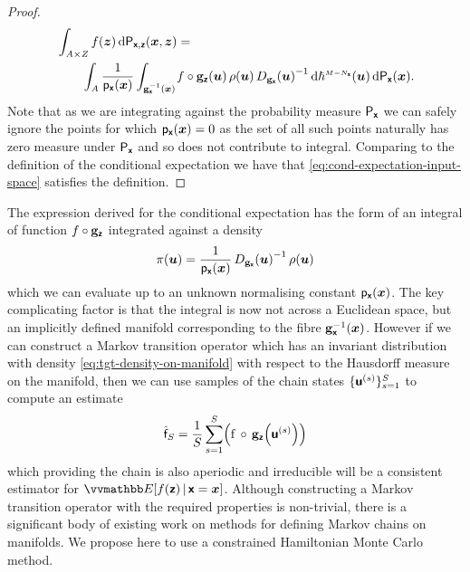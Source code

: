 \begin{proof}
\begin{equation*}
\begin{split}
  &\int_{\set{A} \times \set{Z}}
    f(\vct{z}) 
  \,\dr\prob{\rvct{x},\rvct{z}}(\vct{x},\vct{z}) =\,\\
  &\qquad
  \int_{\set{A}}
  \frac{1}{\pden{\rvct{x}}(\vct{x})}
  \int_{\preimage{\genfunc_{\rvct{x}}}{\vct{x}}}\kern-1pt
   f\circ\genfunc_{\rvct{z}}(\vct{u})\,
   \rho(\vct{u})\,
   \jacobproddet{\genfunc_{\rvct{x}}}{\vct{u}}^{-1}
  \,\dr\haum{M-{N_{\rvct{x}}}}(\vct{u})
  \,\dr\prob{\rvct{x}}(\vct{x}).
\end{split}
\end{equation*}
Note that as we are integrating against the probability measure $\mathsf{P}_{\boldsymbol{\mathsf{x}}}$ we can safely ignore the points for which $\mathsf{p}_{\boldsymbol{\mathsf{x}}}(\boldsymbol{x}) = 0$ as the set of all such points naturally has zero measure under $\mathsf{P}_{\boldsymbol{\mathsf{x}}}$ and so does not contribute to integral. Comparing to the definition of the conditional expectation we have that \eqref{eq:cond-expectation-input-space} satisfies the definition. \qedhere
\end{proof}

The expression derived for the conditional expectation has the form of an integral of function $f \circ {\mathbf{g}}_{\boldsymbol{\mathsf{z}}}$ integrated against a density
\begin{equation}\label{eq:tgt-density-on-manifold}
    \pi(\vct{u}) =
    \frac{1}{\pden{\rvct{x}}(\vct{x})}\,
    \jacobproddet{\genfunc_{\rvct{x}}}{\vct{u}}^{-1}\,
    \rho(\vct{u}) 
\end{equation}
which we can evaluate up to an unknown normalising constant $\mathsf{p}_{\boldsymbol{\mathsf{x}}}(\boldsymbol{x})$. The key complicating factor is that the integral is now not across a Euclidean space, but an implicitly defined manifold corresponding to the fibre ${\mathbf{g}}_{\boldsymbol{\mathsf{x}}}^{-1}(\boldsymbol{x})$. However if we can construct a Markov transition operator which has an invariant distribution with density \eqref{eq:tgt-density-on-manifold} with respect to the Hausdorff measure on the manifold, then we can use samples of the chain states $\lbrace\boldsymbol{\mathsf{u}}^{(s)}\rbrace_{s=1}^S$ to compute an estimate
\begin{equation}\label{eq:mc-est-cond-expc}
    \hat{\rvar{f}}_S =
    \frac{1}{S} 
    \sum_{s=1}^S \lpa
      \func{f}\,\circ\,\genfunc_{\rvct{z}}\lpa\rvct{u}^{(s)}\rpa
    \rpa
\end{equation}
which providing the chain is also aperiodic and irreducible will be a consistent estimator for $\expc{f(\rvct{z}) \gvn \rvct{x} = \vct{x}}$. Although constructing a Markov transition operator with the required properties is non-trivial, there is a significant body of existing work on methods for defining Markov chains on manifolds. We propose here to use a constrained Hamiltonian Monte Carlo method.


